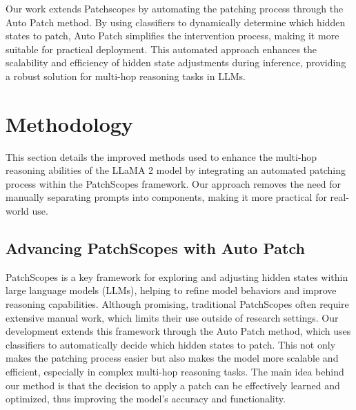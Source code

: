 \documentclass[11pt]{article}
\begin{document}
Our work extends Patchscopes by automating the patching process through the Auto Patch method. By using classifiers to dynamically determine which hidden states to patch, Auto Patch simplifies the intervention process, making it more suitable for practical deployment. This automated approach enhances the scalability and efficiency of hidden state adjustments during inference, providing a robust solution for multi-hop reasoning tasks in LLMs.



\section{Methodology}
This section details the improved methods used to enhance the multi-hop reasoning abilities of the LLaMA 2 model by integrating an automated patching process within the PatchScopes framework. Our approach removes the need for manually separating prompts into components, making it more practical for real-world use.

\subsection{Advancing PatchScopes with Auto Patch}
PatchScopes is a key framework for exploring and adjusting hidden states within large language models (LLMs), helping to refine model behaviors and improve reasoning capabilities. Although promising, traditional PatchScopes often require extensive manual work, which limits their use outside of research settings. Our development extends this framework through the Auto Patch method, which uses classifiers to automatically decide which hidden states to patch. This not only makes the patching process easier but also makes the model more scalable and efficient, especially in complex multi-hop reasoning tasks. The main idea behind our method is that the decision to apply a patch can be effectively learned and optimized, thus improving the model’s accuracy and functionality.
\end{document}
